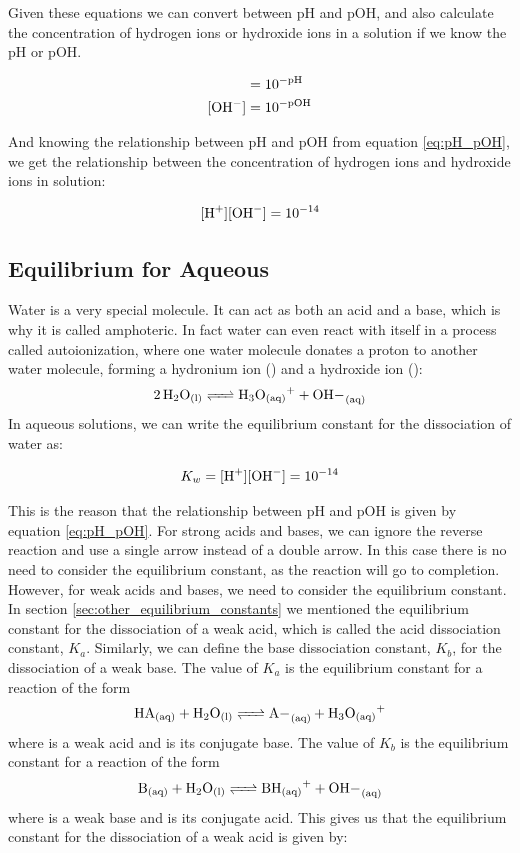Given these equations we can convert between pH and pOH, and also calculate the concentration of hydrogen ions or hydroxide ions in a solution if we know the pH or pOH.

\begin{align}
    [\ce{H+}] &= 10^{-\text{pH}} \label{eq:H+} \\
    [\ce{OH-}] &= 10^{-\text{pOH}} \label{eq:OH-}
\end{align}

And knowing the relationship between pH and pOH from equation \eqref{eq:pH_pOH}, we get the relationship between the concentration of hydrogen ions and hydroxide ions in solution:

\begin{equation}\label{eq:Kw}
    [\ce{H+}] [\ce{OH-}] = 10^{-14}
\end{equation}

\subsection{Equilibrium for Aqueous}

Water is a very special molecule. It can act as both an acid and a base, which is why it is called amphoteric. In fact water can even react with itself in a process called autoionization, where one water molecule donates a proton to another water molecule, forming a hydronium ion () and a hydroxide ion ():
\[\ce{2H2O_{(l)} <=> H3O+_{(aq)} + OH-_{(aq)}}\]
In aqueous solutions, we can write the equilibrium constant for the dissociation of water as:

\begin{equation}
    K_w = [\ce{H+}] [\ce{OH-}] = 10^{-14}
\end{equation}

This is the reason that the relationship between pH and pOH is given by equation \eqref{eq:pH_pOH}.
For strong acids and bases, we can ignore the reverse reaction and use a single arrow instead of a double arrow. In this case there is no need to consider the equilibrium constant, as the reaction will go to completion. However, for weak acids and bases, we need to consider the equilibrium constant. In section \ref{sec:other_equilibrium_constants} we mentioned the equilibrium constant for the dissociation of a weak acid, which is called the acid dissociation constant, $K_a$. Similarly, we can define the base dissociation constant, $K_b$, for the dissociation of a weak base. The value of $K_a$ is the equilibrium constant for a reaction of the form
\[\ce{HA_{(aq)} + H2O_{(l)} <=> A-_{(aq)} + H3O+_{(aq)}}\]
where  is a weak acid and  is its conjugate base. The value of $K_b$ is the equilibrium constant for a reaction of the form
\[\ce{B_{(aq)} + H2O_{(l)} <=> BH+_{(aq)} + OH-_{(aq)}}\]
where  is a weak base and  is its conjugate acid.
This gives us that the equilibrium constant for the dissociation of a weak acid is given by:

